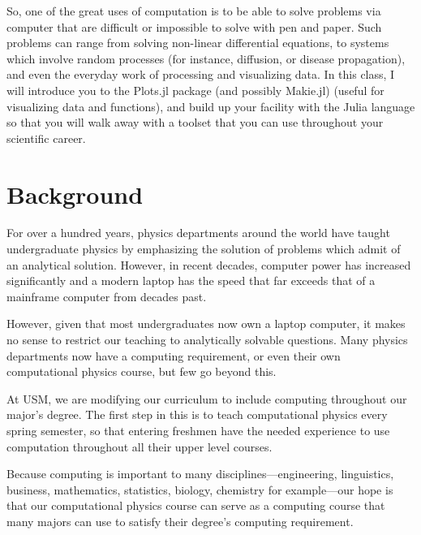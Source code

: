 \documentclass[justified]{tufte-handout}
\begin{document}
So, one of the great uses of computation is to be able to solve problems 
via computer that are difficult or impossible to solve with pen and paper.
Such problems can range from solving non-linear differential equations, to
systems which involve random processes (for instance,
diffusion, or disease propagation), and even the everyday work of processing and visualizing data.
In this class, I will introduce you to the Plots.jl package (and possibly Makie.jl) (useful for visualizing data and functions), and build up your 
facility with the Julia language so that you will walk away with a toolset that you can
use throughout your scientific career. 

\section*{Background}

For over a hundred years, physics departments around the world have taught undergraduate physics by emphasizing the solution of problems which admit of an analytical solution.
 However, in recent decades, computer power has increased significantly and a modern laptop has the speed that far exceeds that of a mainframe computer from decades past.

However, given that most undergraduates now own a laptop computer, it makes no sense to restrict our teaching to analytically solvable questions.
Many physics departments now have a computing requirement, or even their own computational physics course, but few go beyond this.

At USM, we are modifying our curriculum to include computing throughout our major's degree. The first step in this is to teach computational physics every spring semester, so that entering freshmen have the needed experience to use computation throughout all their upper level courses.

Because computing is important to many disciplines—engineering, linguistics, business, mathematics, statistics, biology, chemistry for example—our hope is that our computational physics course can serve as a computing course that many majors can use to satisfy their degree's computing requirement.
\end{document}
